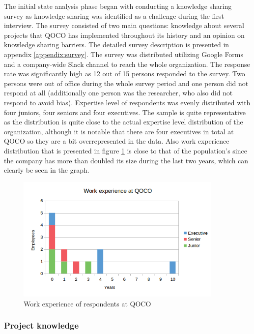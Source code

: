 The initial state analysis phase began with conducting a knowledge sharing survey as knowledge sharing was identified as a challenge during the first interview. The survey consisted of
two main questions: knowledge about several projects that QOCO has implemented throughout its history and an opinion on knowledge sharing barriers. The detailed survey description
is presented in appendix \ref{appendix:survey}. The survey was distributed utilizing Google Forms and a company-wide Slack channel to reach the whole organization. The response
rate was significantly high as 12 out of 15 persons responded to the survey. Two persons were out of office during the whole survey period and one person did not respond at all
(additionally one person was the researcher, who also did not respond to avoid bias). Expertise level of respondents was evenly distributed with four juniors, four seniors and four
executives. The sample is quite representative as the distribution is quite close to the actual expertise level distribution of the organization, although it is notable that there are
four executives in total at QOCO so they are a bit overrepresented in the data. Also work experience distribution that is presented in figure \ref{fig:work-experience-before} is close to
that of the population's since the company has more than doubled its size during the last two years, which can clearly be seen in the graph.

\begin{figure}[ht]
  \begin{center}
    \includegraphics[width=0.9\textwidth]{images/work-experience-before-2.png}
    \caption{Work experience of respondents at QOCO}
    \label{fig:work-experience-before}
  \end{center}
\end{figure}

\subsubsection*{Project knowledge}

